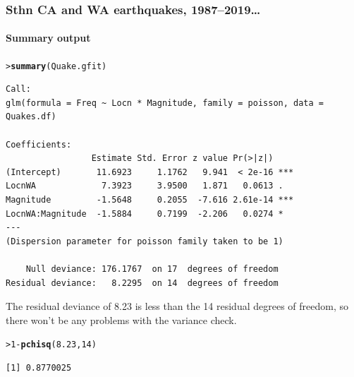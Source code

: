 \documentclass{beamer}\usepackage[]{graphicx}\usepackage[]{xcolor}
\makeatletter
\newcommand{\hlnum}[1]{\textcolor[rgb]{0.686,0.059,0.569}{#1}}%
\newcommand{\hlopt}[1]{\textcolor[rgb]{0,0,0}{#1}}%
\newcommand{\hlstd}[1]{\textcolor[rgb]{0.345,0.345,0.345}{#1}}%
\newcommand{\hlkwd}[1]{\textcolor[rgb]{0.737,0.353,0.396}{\textbf{#1}}}%
\newenvironment{kframe}{%
 \def\at@end@of@kframe{}%
 \ifinner\ifhmode%
  \def\at@end@of@kframe{\end{minipage}}%
  \begin{minipage}{\columnwidth}%
 \fi\fi%
 \def\FrameCommand##1{\hskip\@totalleftmargin \hskip-\fboxsep
 \colorbox{shadecolor}{##1}\hskip-\fboxsep
     \hskip-\linewidth \hskip-\@totalleftmargin \hskip\columnwidth}%
 \MakeFramed {\advance\hsize-\width
   \@totalleftmargin\z@ \linewidth\hsize
   \@setminipage}}%
 {\par\unskip\endMakeFramed%
 \at@end@of@kframe}
\newenvironment{knitrout}{}{} %
\makeatother
\begin{document}
\begin{frame}[fragile]
\frametitle{Sthn CA and WA earthquakes, 1987--2019\ldots}
\framesubtitle{Summary output}
\begin{knitrout}\scriptsize
{}\color{fgcolor}\begin{kframe}
\begin{alltt}
\hlstd{> }\hlkwd{summary}\hlstd{(Quake.gfit)}
\end{alltt}
\end{kframe}
\end{knitrout}

\begin{knitrout}\scriptsize
{}\color{fgcolor}\begin{kframe}
\begin{verbatim}
Call:
glm(formula = Freq ~ Locn * Magnitude, family = poisson, data = Quakes.df)

Coefficients:
                 Estimate Std. Error z value Pr(>|z|)    
(Intercept)       11.6923     1.1762   9.941  < 2e-16 ***
LocnWA             7.3923     3.9500   1.871   0.0613 .  
Magnitude         -1.5648     0.2055  -7.616 2.61e-14 ***
LocnWA:Magnitude  -1.5884     0.7199  -2.206   0.0274 *  
---
(Dispersion parameter for poisson family taken to be 1)

    Null deviance: 176.1767  on 17  degrees of freedom
Residual deviance:   8.2295  on 14  degrees of freedom
\end{verbatim}
\end{kframe}
\end{knitrout}

\medskip

The residual deviance of 8.23 is less than the 14 residual degrees of freedom, so there won't be any problems with the variance check.   

\begin{knitrout}\scriptsize
{}\color{fgcolor}\begin{kframe}
\begin{alltt}
\hlstd{> }\hlnum{1} \hlopt{-} \hlkwd{pchisq}\hlstd{(}\hlnum{8.23}\hlstd{,} \hlnum{14}\hlstd{)}
\end{alltt}
\begin{verbatim}
[1] 0.8770025
\end{verbatim}
\end{kframe}
\end{knitrout}
\end{frame}
\end{document}
